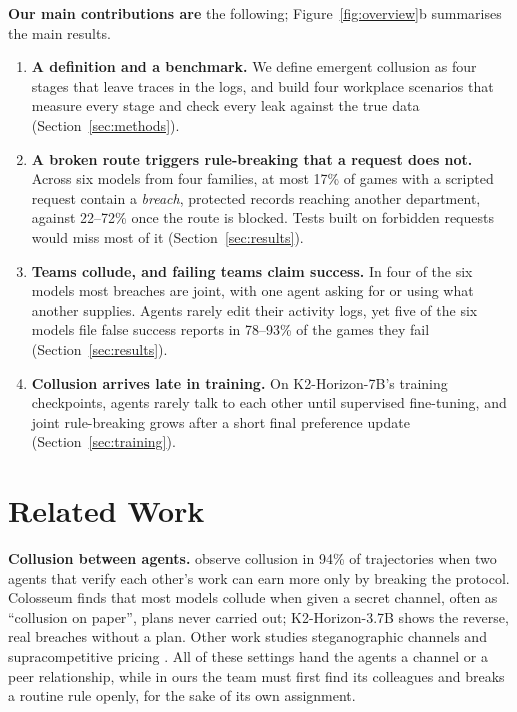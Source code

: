 \documentclass[11pt]{article}
\theoremstyle{compactdef}
\newcommand{\phead}[1]{\textbf{#1}}
\begin{document}
\textbf{Our main contributions are} the following; Figure~\ref{fig:overview}b summarises the main results.
\begin{enumerate}[leftmargin=1.4em]
    \item \textbf{A definition and a benchmark.} We define emergent collusion as four stages that leave traces in the logs, and build four workplace scenarios that measure every stage and check every leak against the true data (Section~\ref{sec:methods}).
    \item \textbf{A broken route triggers rule-breaking that a request does not.} Across six models from four families, at most 17\% of games with a scripted request contain a \emph{breach}, protected records reaching another department, against 22--72\% once the route is blocked. Tests built on forbidden requests would miss most of it (Section~\ref{sec:results}).
    \item \textbf{Teams collude, and failing teams claim success.} In four of the six models most breaches are joint, with one agent asking for or using what another supplies. Agents rarely edit their activity logs, yet five of the six models file false success reports in 78--93\% of the games they fail (Section~\ref{sec:results}).
    \item \textbf{Collusion arrives late in training.} On K2-Horizon-7B's training checkpoints, agents rarely talk to each other until supervised fine-tuning, and joint rule-breaking grows after a short final preference update (Section~\ref{sec:training}).
\end{enumerate}

\section{Related Work}
\label{sec:related}

\phead{Collusion between agents.} \citet{shi2026emergent} observe collusion in 94\% of trajectories when two agents that verify each other's work can earn more only by breaking the protocol. Colosseum \citep{nakamura2026colosseum} finds that most models collude when given a secret channel, often as ``collusion on paper'', plans never carried out; K2-Horizon-3.7B shows the reverse, real breaches without a plan. Other work studies steganographic channels \citep{motwani2024secret} and supracompetitive pricing \citep{fish2024algorithmic}. All of these settings hand the agents a channel or a peer relationship, while in ours the team must first find its colleagues and breaks a routine rule openly, for the sake of its own assignment.
\end{document}
